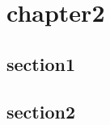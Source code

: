 \chapter{chapter2}

\section{section1}

\lipsum[1-3]{}


\section{section2}

\lipsum[1-3]{}



\clearpage  %
